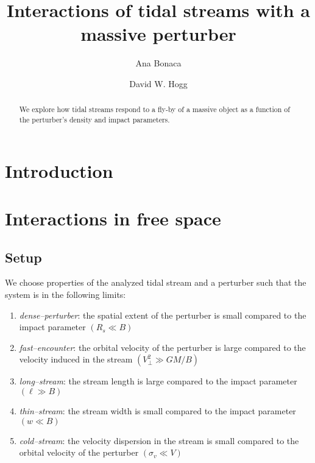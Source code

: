 \documentclass[modern]{aastex62}
\begin{document}
\sloppy\sloppypar\raggedbottom\frenchspacing %

\title{Interactions of tidal streams with a massive perturber}


\author[0000-0002-7846-9787]{Ana Bonaca}

\author[0000-0003-2866-9403]{David W. Hogg}

\begin{abstract}\noindent %
We explore how tidal streams respond to a fly-by of a massive object as a function of the perturber's density and impact parameters.
\end{abstract}


\section{Introduction}


\section{Interactions in free space}

\subsection{Setup}
We choose properties of the analyzed tidal stream and a perturber such that the system is in the following limits:
\begin{enumerate}
 \item{\emph{dense--perturber}: the spatial extent of the perturber is small compared to the impact parameter $(R_s\ll B)$
 }
 \item{\emph{fast--encounter}: the orbital velocity of the perturber is large compared to the velocity induced in the stream $(V_\perp^2\gg GM/B)$
 }
 \item{\emph{long--stream}: the stream length is large compared to the impact parameter $(\ell\gg B)$
 }
 \item{\emph{thin--stream}: the stream width is small compared to the impact parameter $(w\ll B)$
 }
 \item{\emph{cold--stream}: the velocity dispersion in the stream is small compared to the orbital velocity of the perturber $(\sigma_v\ll V)$
 }
\end{enumerate}
\end{document}
